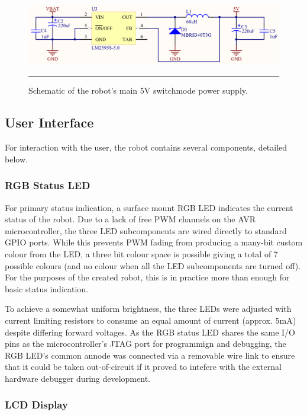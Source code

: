 \begin{figure}[h]
	\centering
		\includegraphics[width=150mm]{./Figures/MainPowerSupply.png}
	\rule{35em}{0.5pt}
	\caption[Main Power Supply Schematic]{Schematic of the robot's main 5V switchmode power supply.}
	\label{fig:mainpowersupply}
\end{figure}

\subsection{User Interface}

For interaction with the user, the robot contains several components, detailed below.

\subsubsection{RGB Status LED}

For primary status indication, a surface mount RGB LED indicates the current status of the robot. Due to a lack of free PWM channels on the AVR microcontroller, the three LED subcomponents are wired directly to standard GPIO ports. While this prevents PWM fading from producing a many-bit custom colour from the LED, a three bit colour space is possible giving a total of 7 possible colours (and no colour when all the LED subcomponents are turned off). For the purposes of the created robot, this is in practice more than enough for basic status indication.

To achieve a somewhat uniform brightness, the three LEDs were adjusted with current limiting resistors to consume an equal amount of current (approx. 5mA) despite differing forward voltages. As the RGB status LED shares the same I/O pins as the microcontroller's JTAG port for programmign and debugging, the RGB LED's common annode was connected via a removable wire link to ensure that it could be taken out-of-circuit if it proved to intefere with the external hardware debugger during development.

\subsubsection{LCD Display}

